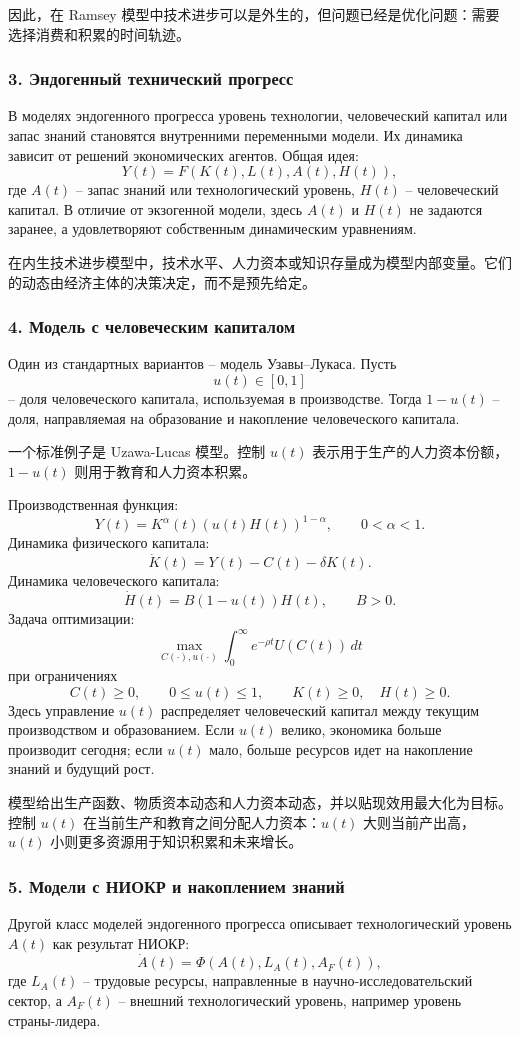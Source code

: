 \documentclass[12pt,a4paper]{article}
\newcommand{\zh}[1]{\par\noindent #1\par}
\begin{document}
\zh{因此，在 Ramsey 模型中技术进步可以是外生的，但问题已经是优化问题：需要选择消费和积累的时间轨迹。}

\subsubsection*{3. Эндогенный технический прогресс}
В моделях эндогенного прогресса уровень технологии, человеческий капитал или запас знаний становятся внутренними переменными модели. Их динамика зависит от решений экономических агентов. Общая идея:
\[
Y(t)=F(K(t),L(t),A(t),H(t)),
\]
где $A(t)$ -- запас знаний или технологический уровень, $H(t)$ -- человеческий капитал. В отличие от экзогенной модели, здесь $A(t)$ и $H(t)$ не задаются заранее, а удовлетворяют собственным динамическим уравнениям.

\zh{在内生技术进步模型中，技术水平、人力资本或知识存量成为模型内部变量。它们的动态由经济主体的决策决定，而不是预先给定。}

\subsubsection*{4. Модель с человеческим капиталом}
Один из стандартных вариантов -- модель Узавы--Лукаса. Пусть
\[
u(t)\in[0,1]
\]
-- доля человеческого капитала, используемая в производстве. Тогда $1-u(t)$ -- доля, направляемая на образование и накопление человеческого капитала.

\zh{一个标准例子是 Uzawa-Lucas 模型。控制 $u(t)$ 表示用于生产的人力资本份额，$1-u(t)$ 则用于教育和人力资本积累。}

Производственная функция:
\[
Y(t)=K^\alpha(t)(u(t)H(t))^{1-\alpha},\qquad 0<\alpha<1.
\]
Динамика физического капитала:
\[
\dot K(t)=Y(t)-C(t)-\delta K(t).
\]
Динамика человеческого капитала:
\[
\dot H(t)=B(1-u(t))H(t),\qquad B>0.
\]
Задача оптимизации:
\[
\max_{C(\cdot),u(\cdot)}\int_0^\infty e^{-\rho t}U(C(t))\,dt
\]
при ограничениях
\[
C(t)\ge 0,\qquad 0\le u(t)\le 1,\qquad K(t)\ge 0,\quad H(t)\ge 0.
\]
Здесь управление $u(t)$ распределяет человеческий капитал между текущим производством и образованием. Если $u(t)$ велико, экономика больше производит сегодня; если $u(t)$ мало, больше ресурсов идет на накопление знаний и будущий рост.

\zh{模型给出生产函数、物质资本动态和人力资本动态，并以贴现效用最大化为目标。控制 $u(t)$ 在当前生产和教育之间分配人力资本：$u(t)$ 大则当前产出高，$u(t)$ 小则更多资源用于知识积累和未来增长。}

\subsubsection*{5. Модели с НИОКР и накоплением знаний}
Другой класс моделей эндогенного прогресса описывает технологический уровень $A(t)$ как результат НИОКР:
\[
\dot A(t)=\Phi(A(t),L_A(t),A_F(t)),
\]
где $L_A(t)$ -- трудовые ресурсы, направленные в научно-исследовательский сектор, а $A_F(t)$ -- внешний технологический уровень, например уровень страны-лидера.
\end{document}
